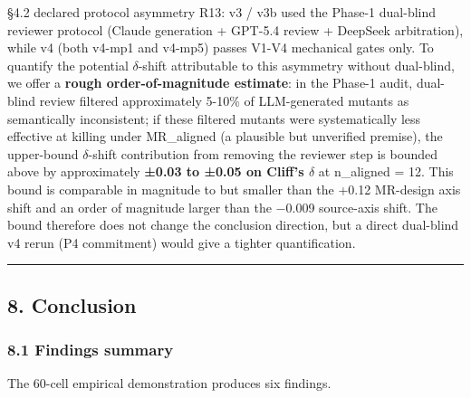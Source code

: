 \documentclass[review,12pt,authoryear]{elsarticle}
\begin{document}
§4.2 declared protocol asymmetry R13: v3 / v3b used the Phase-1
dual-blind reviewer protocol (Claude generation + GPT-5.4 review +
DeepSeek arbitration), while v4 (both v4-mp1 and v4-mp5) passes V1-V4
mechanical gates only. To quantify the potential $\delta$-shift attributable to
this asymmetry without dual-blind, we offer a \textbf{rough
order-of-magnitude estimate}: in the Phase-1 audit, dual-blind review
filtered approximately 5-10\% of LLM-generated mutants as semantically
inconsistent; if these filtered mutants were systematically less
effective at killing under MR\_aligned (a plausible but unverified
premise), the upper-bound $\delta$-shift contribution from removing the
reviewer step is bounded above by approximately \textbf{±0.03 to ±0.05
on Cliff's $\delta$} at n\_aligned = 12. This bound is comparable in magnitude
to but smaller than the +0.12 MR-design axis shift and an order of
magnitude larger than the −0.009 source-axis shift. The bound therefore
does not change the conclusion direction, but a direct dual-blind v4
rerun (P4 commitment) would give a tighter quantification.

\begin{center}\rule{0.5\linewidth}{0.5pt}\end{center}

\subsection{8. Conclusion}\label{conclusion}

\subsubsection{8.1 Findings summary}\label{findings-summary}

The 60-cell empirical demonstration produces six findings.
\end{document}
